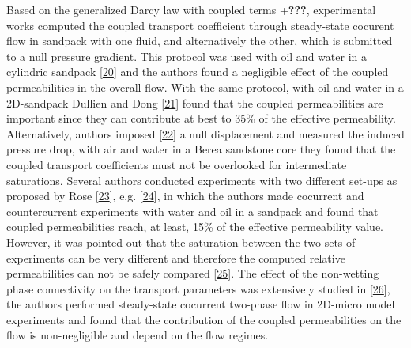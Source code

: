 \documentclass[]{article}
\begin{document}
Based on the generalized Darcy law with coupled terms +\textbf{???},
experimental works computed the coupled transport coefficient through
steady-state cocurent flow in sandpack with one fluid, and alternatively
the other, which is submitted to a null pressure gradient. This protocol
was used with oil and water in a cylindric sandpack
{[}\protect\hyperlink{ref-zarcone1994determination}{20}{]} and the
authors found a negligible effect of the coupled permeabilities in the
overall flow. With the same protocol, with oil and water in a
2D-sandpack Dullien and Dong
{[}\protect\hyperlink{ref-Dullien1996}{21}{]} found that the coupled
permeabilities are important since they can contribute at best to 35\%
of the effective permeability. Alternatively, authors imposed
{[}\protect\hyperlink{ref-ramakrishnan2015measurement}{22}{]} a null
displacement and measured the induced pressure drop, with air and water
in a Berea sandstone core they found that the coupled transport
coefficients must not be overlooked for intermediate saturations.
Several authors conducted experiments with two different set-ups as
proposed by Rose {[}\protect\hyperlink{ref-Rose1988}{23}{]}, e.g.
{[}\protect\hyperlink{ref-bentsen1993use}{24}{]}, in which the authors
made cocurrent and countercurrent experiments with water and oil in a
sandpack and found that coupled permeabilities reach, at least, 15\% of
the effective permeability value. However, it was pointed out that the
saturation between the two sets of experiments can be very different and
therefore the computed relative permeabilities can not be safely
compared {[}\protect\hyperlink{ref-langaas2001numerical}{25}{]}. The
effect of the non-wetting phase connectivity on the transport parameters
was extensively studied in {[}\protect\hyperlink{ref-Avraam1995}{26}{]},
the authors performed steady-state cocurrent two-phase flow in 2D-micro
model experiments and found that the contribution of the coupled
permeabilities on the flow is non-negligible and depend on the flow
regimes.
\end{document}
